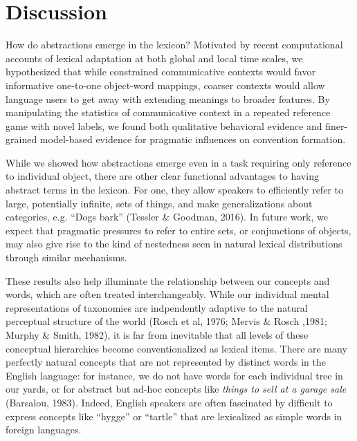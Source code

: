 \documentclass[10pt,letterpaper]{article}
\begin{document}
\section{Discussion}

How do abstractions emerge in the lexicon? Motivated by recent computational accounts of lexical adaptation at both global and local time scales, we hypothesized that while constrained communicative contexts would favor informative one-to-one object-word mappings, coarser contexts would allow language users to get away with extending meanings to broader features. By manipulating the statistics of communicative context in a repeated reference game with novel labels, we found both qualitative behavioral evidence and finer-grained model-based evidence for pragmatic influences on convention formation.

While we showed how abstractions emerge even in a task requiring only reference to individual object, there are other clear functional advantages to having abstract terms in the lexicon. For one, they allow speakers to efficiently refer to large, potentially infinite, sets of things, and make generalizations about categories, e.g. ``Dogs bark'' (Tessler \& Goodman, 2016). In future work, we expect that pragmatic pressures to refer to entire sets, or conjunctions of objects, may also give rise to the kind of nestedness seen in natural lexical distributions through similar mechanisms.

These results also help illuminate the relationship between our concepts and words, which are often treated interchangeably. While our individual mental representations of taxonomies are indpendently adaptive to the natural perceptual structure of the world (Rosch et al, 1976; Mervis \& Rosch ,1981; Murphy \& Smith, 1982), it is far from inevitable that all levels of these conceptual hierarchies become conventionalized as lexical items. There are many perfectly natural concepts that are not represented by distinct words in the English language: for instance, we do not have words for each individual tree in our yards, or for abstract but ad-hoc concepts like \emph{things to sell at a garage sale} (Barsalou, 1983). Indeed, English speakers are often fascinated by difficult to express concepts like ``hygge'' or ``tartle'' that are lexicalized as simple words in foreign languages.

\end{document}
